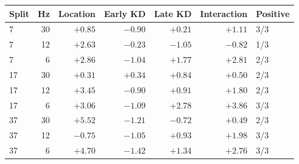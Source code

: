 \begin{tabular}{lrrrrrl}
\toprule
Split & Hz & Location & Early KD & Late KD & Interaction & Positive \\
\midrule
7 & 30 & $+0.85$ & $-0.90$ & $+0.21$ & $+1.11$ & 3/3 \\
7 & 12 & $+2.63$ & $-0.23$ & $-1.05$ & $-0.82$ & 1/3 \\
7 & 6 & $+2.86$ & $-1.04$ & $+1.77$ & $+2.81$ & 2/3 \\
17 & 30 & $+0.31$ & $+0.34$ & $+0.84$ & $+0.50$ & 2/3 \\
17 & 12 & $+3.45$ & $-0.90$ & $+0.91$ & $+1.80$ & 2/3 \\
17 & 6 & $+3.06$ & $-1.09$ & $+2.78$ & $+3.86$ & 3/3 \\
37 & 30 & $+5.52$ & $-1.21$ & $-0.72$ & $+0.49$ & 2/3 \\
37 & 12 & $-0.75$ & $-1.05$ & $+0.93$ & $+1.98$ & 3/3 \\
37 & 6 & $+4.70$ & $-1.42$ & $+1.34$ & $+2.76$ & 3/3 \\
\bottomrule
\end{tabular}
